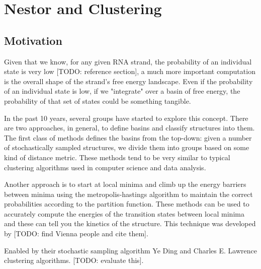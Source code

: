 \chapter{Nestor and Clustering}
\section{Motivation}

Given that we know, for any given RNA strand, the probability of an
individual state is very low [TODO: reference section], a much more
important computation is the overall shape of the strand's free energy
landscape. Even if the probability of an individual state is low, if
we "integrate" over a basin of free energy, the probability of that
set of states could be something tangible.

In the past 10 years, several groups have started to explore this
concept. There are two approaches, in general, to define basins and
classify structures into them. The first class of methods defines the
basins from the top-down: given a number of stochastically sampled
structures, we divide them into groups based on some kind of distance
metric. These methods tend to be very similar to typical clustering
algorithms used in computer science and data analysis.

Another approach is to start at local minima and climb up the energy
barriers between minima using the metropolis-hastings algorithm to
maintain the correct probabilities according to the partition
function. These methods can be used to accurately compute the energies
of the transition states between local minima and these can tell you
the kinetics of the structure. This technique was developed by [TODO:
find Vienna people and cite them].

 Enabled by their stochastic sampling algorithm Ye Ding and
Charles E. Lawrence clustering algorithms. [TODO: evaluate this].